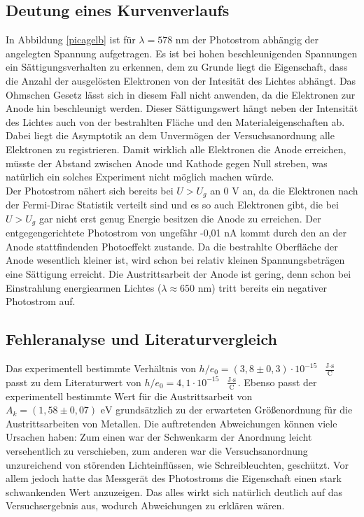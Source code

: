 %
\subsection{Deutung eines Kurvenverlaufs}

In Abbildung \ref{picagelb} ist für $\lambda=578\text{ nm}$ der Photostrom abhängig der
angelegten Spannung aufgetragen. Es ist bei hohen beschleunigenden Spannungen ein
Sättigungsverhalten zu erkennen, dem zu Grunde liegt die Eigenschaft, dass die Anzahl der
ausgelösten Elektronen von der Intesität des Lichtes abhängt. Das Ohmschen Gesetz lässt sich in diesem Fall 
nicht anwenden, da die Elektronen zur Anode hin beschleunigt werden. Dieser Sättigungswert hängt neben
der Intensität des Lichtes auch von der bestrahlten Fläche und den Materialeigenschaften ab. Dabei liegt 
die Asymptotik an dem Unvermögen der Versuchsanordnung alle Elektronen zu registrieren. Damit wirklich 
alle Elektronen die Anode erreichen, müsste der Abstand zwischen Anode und Kathode gegen Null
streben, was natürlich ein solches Experiment nicht möglich machen würde.\\ 
Der Photostrom nähert sich bereits bei $U>U_g$ an 0 V an, da die Elektronen nach der Fermi-Dirac 
Statistik verteilt sind und es so auch Elektronen gibt, die bei $U>U_g$ gar nicht erst genug
Energie besitzen die Anode zu erreichen. Der entgegengerichtete Photostrom von ungefähr -0,01 nA 
kommt durch den an der Anode stattfindenden Photoeffekt zustande. Da die bestrahlte Oberfläche der 
Anode wesentlich kleiner ist, wird schon bei relativ kleinen Spannungsbeträgen eine Sättigung erreicht.
Die Austrittsarbeit der Anode ist gering, denn schon bei Einstrahlung energiearmen Lichtes 
($\lambda \approx 650$ nm)\cite{anleitung} tritt bereits ein negativer Photostrom auf.

\subsection{Fehleranalyse und Literaturvergleich}
Das experimentell bestimmte Verhältnis von $h/e_0=(3,8\pm0,3)\cdot10^{-15}\text{ }\frac{\text{J$\cdot$s}}{\text{C}}$
passt zu dem Literaturwert \cite{tafel} von $h/e_0=4,1\cdot10^{-15}\text{ }\frac{\text{J$\cdot$s}}{\text{C}}$.
Ebenso passt der experimentell bestimmte Wert für die Austrittsarbeit von $A_k=(1,58\pm0,07)\text{ eV}$
grundsätzlich zu der erwarteten Größenordnung für die Austrittsarbeiten von Metallen.
Die auftretenden Abweichungen können viele Ursachen haben:
Zum einen war der Schwenkarm der Anordnung leicht versehentlich zu verschieben, zum anderen war die Versuchsanordnung unzureichend von
störenden Lichteinflüssen, wie Schreibleuchten, geschützt. Vor allem jedoch hatte das Messgerät des
Photostroms die Eigenschaft einen stark schwankenden Wert anzuzeigen. Das alles wirkt sich natürlich 
deutlich auf das Versuchsergebnis aus, wodurch Abweichungen zu erklären wären. 